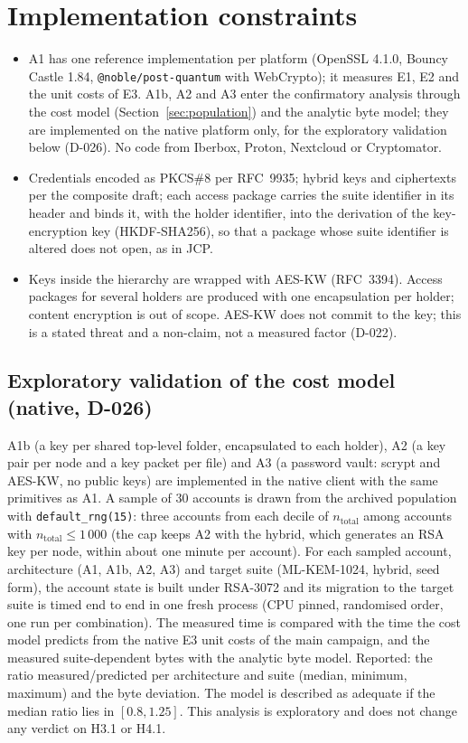 \documentclass[11pt,a4paper]{article}
\begin{document}
\section{Implementation constraints}\label{sec:impl}
\begin{itemize}
\item A1 has one reference implementation per platform (OpenSSL 4.1.0, Bouncy Castle 1.84, \texttt{@noble/\allowbreak{}post-quantum} with WebCrypto); it measures E1, E2 and the unit costs of E3. A1b, A2 and A3 enter the confirmatory analysis through the cost model (Section~\ref{sec:population}) and the analytic byte model; they are implemented on the native platform only, for the exploratory validation below (D-026). No code from Iberbox, Proton, Nextcloud or Cryptomator.
\item Credentials encoded as PKCS\#8 per RFC~9935; hybrid keys and ciphertexts per the composite draft; each access package carries the suite identifier in its header and binds it, with the holder identifier, into the derivation of the key-encryption key (HKDF-SHA256), so that a package whose suite identifier is altered does not open, as in JCP.
\item Keys inside the hierarchy are wrapped with AES-KW (RFC~3394). Access packages for several holders are produced with one encapsulation per holder; content encryption is out of scope. AES-KW does not commit to the key; this is a stated threat and a non-claim, not a measured factor (D-022).
\end{itemize}

\subsection*{Exploratory validation of the cost model (native, D-026)}
A1b (a key per shared top-level folder, encapsulated to each holder), A2 (a key pair per node and a key packet per file) and A3 (a password vault: scrypt and AES-KW, no public keys) are implemented in the native client with the same primitives as A1. A sample of 30 accounts is drawn from the archived population with \texttt{default\_\allowbreak{}rng(15)}: three accounts from each decile of $n_{\mathrm{total}}$ among accounts with $n_{\mathrm{total}} \le 1\,000$ (the cap keeps A2 with the hybrid, which generates an RSA key per node, within about one minute per account). For each sampled account, architecture (A1, A1b, A2, A3) and target suite (ML-KEM-1024, hybrid, seed form), the account state is built under RSA-3072 and its migration to the target suite is timed end to end in one fresh process (CPU pinned, randomised order, one run per combination). The measured time is compared with the time the cost model predicts from the native E3 unit costs of the main campaign, and the measured suite-dependent bytes with the analytic byte model. Reported: the ratio measured/predicted per architecture and suite (median, minimum, maximum) and the byte deviation. The model is described as adequate if the median ratio lies in $[0.8, 1.25]$. This analysis is exploratory and does not change any verdict on H3.1 or H4.1.
\end{document}

